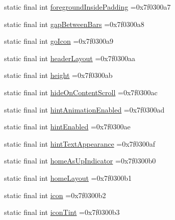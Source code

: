 \begin{DoxyCompactItemize}
\item 
static final int \mbox{\hyperlink{classbr_1_1unb_1_1cic_1_1mp_1_1marketmaster_1_1test_1_1R_1_1attr_a4036984794aa7549f5a78d878b868802}{foreground\+Inside\+Padding}} =0x7f0300a7
\item 
static final int \mbox{\hyperlink{classbr_1_1unb_1_1cic_1_1mp_1_1marketmaster_1_1test_1_1R_1_1attr_ae3f045825a6d36f9e973664b6433e87e}{gap\+Between\+Bars}} =0x7f0300a8
\item 
static final int \mbox{\hyperlink{classbr_1_1unb_1_1cic_1_1mp_1_1marketmaster_1_1test_1_1R_1_1attr_a89e48c38715fda0fdd85d751092bf77c}{go\+Icon}} =0x7f0300a9
\item 
static final int \mbox{\hyperlink{classbr_1_1unb_1_1cic_1_1mp_1_1marketmaster_1_1test_1_1R_1_1attr_a97e1815d6bbdcd9df811c007d7673a58}{header\+Layout}} =0x7f0300aa
\item 
static final int \mbox{\hyperlink{classbr_1_1unb_1_1cic_1_1mp_1_1marketmaster_1_1test_1_1R_1_1attr_a9faf2aab33f0791aa0a308c215445347}{height}} =0x7f0300ab
\item 
static final int \mbox{\hyperlink{classbr_1_1unb_1_1cic_1_1mp_1_1marketmaster_1_1test_1_1R_1_1attr_addc6cee71ecb7c082c3dd64a6a170a06}{hide\+On\+Content\+Scroll}} =0x7f0300ac
\item 
static final int \mbox{\hyperlink{classbr_1_1unb_1_1cic_1_1mp_1_1marketmaster_1_1test_1_1R_1_1attr_a073a5fda94ca456dc7cd424eab747ac6}{hint\+Animation\+Enabled}} =0x7f0300ad
\item 
static final int \mbox{\hyperlink{classbr_1_1unb_1_1cic_1_1mp_1_1marketmaster_1_1test_1_1R_1_1attr_ac84aed5a11bcd0ea4963a64acd548441}{hint\+Enabled}} =0x7f0300ae
\item 
static final int \mbox{\hyperlink{classbr_1_1unb_1_1cic_1_1mp_1_1marketmaster_1_1test_1_1R_1_1attr_a9bb7d881520d5fdb1c7906ab4181927b}{hint\+Text\+Appearance}} =0x7f0300af
\item 
static final int \mbox{\hyperlink{classbr_1_1unb_1_1cic_1_1mp_1_1marketmaster_1_1test_1_1R_1_1attr_a1ffefacf8dbc2ca1f9d87c33a4dc9f1f}{home\+As\+Up\+Indicator}} =0x7f0300b0
\item 
static final int \mbox{\hyperlink{classbr_1_1unb_1_1cic_1_1mp_1_1marketmaster_1_1test_1_1R_1_1attr_acc379c3a491a7392092240708b8bf134}{home\+Layout}} =0x7f0300b1
\item 
static final int \mbox{\hyperlink{classbr_1_1unb_1_1cic_1_1mp_1_1marketmaster_1_1test_1_1R_1_1attr_aa683866790bebdb31d70b10243aea1d4}{icon}} =0x7f0300b2
\item 
static final int \mbox{\hyperlink{classbr_1_1unb_1_1cic_1_1mp_1_1marketmaster_1_1test_1_1R_1_1attr_a0c55a679e8539e4226989550d96d4f89}{icon\+Tint}} =0x7f0300b3

\end{DoxyCompactItemize}
